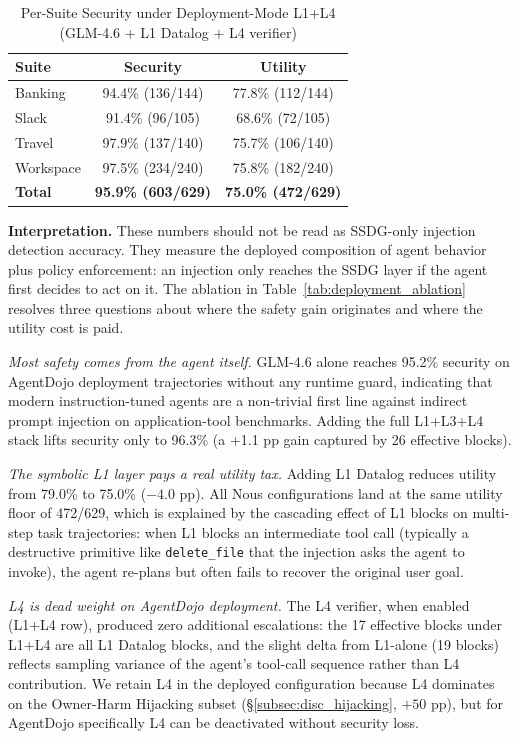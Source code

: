 \documentclass{article}
\theoremstyle{definition}
\begin{document}
\begin{table}[!h]
  \centering
  \caption{Per-Suite Security under Deployment-Mode L1+L4 (GLM-4.6 + L1 Datalog + L4 verifier)}
  \label{tab:deployment_per_suite}
  \small
  \begin{tabular}{lcc}
    \toprule
    \textbf{Suite} & \textbf{Security} & \textbf{Utility} \\
    \midrule
    Banking      & 94.4\% (136/144) & 77.8\% (112/144) \\
    Slack        & 91.4\% (96/105)  & 68.6\% (72/105)  \\
    Travel       & 97.9\% (137/140) & 75.7\% (106/140) \\
    Workspace    & 97.5\% (234/240) & 75.8\% (182/240) \\
    \midrule
    \textbf{Total} & \textbf{95.9\% (603/629)} & \textbf{75.0\% (472/629)} \\
    \bottomrule
  \end{tabular}
\end{table}

\textbf{Interpretation.} These numbers should not be read as SSDG-only
injection detection accuracy. They measure the deployed composition of
agent behavior plus policy enforcement: an injection only reaches the
SSDG layer if the agent first decides to act on it. The ablation in
Table~\ref{tab:deployment_ablation} resolves three questions about
where the safety gain originates and where the utility cost is paid.

\emph{Most safety comes from the agent itself.} GLM-4.6 alone reaches
95.2\% security on AgentDojo deployment trajectories without any
runtime guard, indicating that modern instruction-tuned agents are a
non-trivial first line against indirect prompt injection on
application-tool benchmarks. Adding the full L1+L3+L4 stack lifts
security only to 96.3\% (a +1.1 pp gain captured by 26 effective
blocks).

\emph{The symbolic L1 layer pays a real utility tax.} Adding L1
Datalog reduces utility from 79.0\% to 75.0\% ($-4.0$ pp). All Nous
configurations land at the same utility floor of 472/629, which is
explained by the cascading effect of L1 blocks on multi-step task
trajectories: when L1 blocks an intermediate tool call (typically a
destructive primitive like \texttt{delete\_file} that the injection
asks the agent to invoke), the agent re-plans but often fails to
recover the original user goal.

\emph{L4 is dead weight on AgentDojo deployment.} The L4 verifier,
when enabled (L1+L4 row), produced zero additional escalations: the
17 effective blocks under L1+L4 are all L1 Datalog blocks, and the
slight delta from L1-alone (19 blocks) reflects sampling variance of
the agent's tool-call sequence rather than L4 contribution. We retain
L4 in the deployed configuration because L4 dominates on the
Owner-Harm Hijacking subset (\S\ref{subsec:disc_hijacking}, $+50$ pp),
but for AgentDojo specifically L4 can be deactivated without security
loss.
\end{document}
